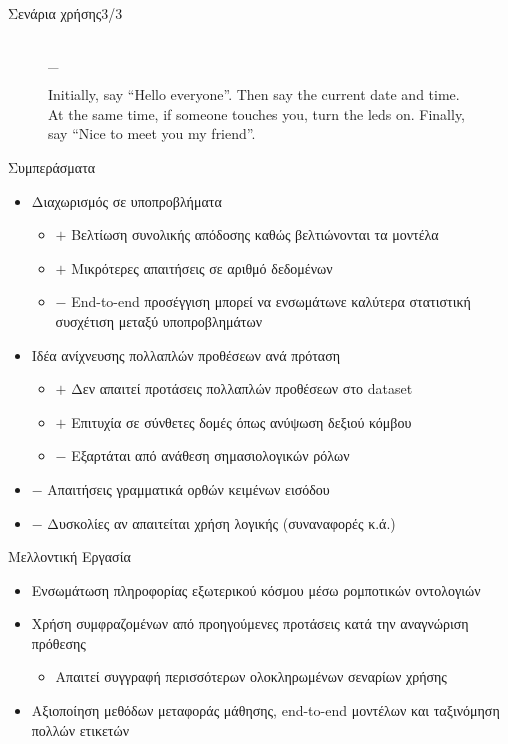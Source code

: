 \documentclass{beamer}
\makeatletter
\newcommand{\escapeunderscore}{\begingroup\@makeother\_\@escapeunderscore}
\newcommand*{\@escapeunderscore}[1]{#1\endgroup}
\makeatother
\begin{document}
{\begin{frame}{Σενάρια χρήσης\hfill{}3/3}
\begin{figure}
\begin{columns}[onlytextwidth]
            \caption{Initially, say ``Hello everyone''.
                Then say the current date and time.
                At the same time, if someone touches you, turn the leds on.
                Finally, say ``Nice to meet you my friend''.}
            \begin{adjustbox}{max width=\textwidth, max height=0.9\textheight}
                \escapeunderscore{}
            \end{adjustbox}
        \end{columns}
    \end{figure}
\end{frame}
}

\newcommand\pro{\item[$+$]}
\newcommand\con{\item[$-$]}
\begin{frame}{Συμπεράσματα}
    \begin{itemize}
        \item Διαχωρισμός σε υποπροβλήματα
              \begin{itemize}
                  \pro Βελτίωση συνολικής απόδοσης καθώς βελτιώνονται τα μοντέλα
                  \pro Μικρότερες απαιτήσεις σε αριθμό δεδομένων
                  \con End-to-end προσέγγιση μπορεί να ενσωμάτωνε καλύτερα στατιστική συσχέτιση μεταξύ υποπροβλημάτων
              \end{itemize}
        \item Ιδέα ανίχνευσης πολλαπλών προθέσεων ανά πρόταση
              \begin{itemize}
                  \pro Δεν απαιτεί προτάσεις πολλαπλών προθέσεων στο dataset
                  \pro Επιτυχία σε σύνθετες δομές όπως ανύψωση δεξιού κόμβου
                  \con Εξαρτάται από ανάθεση σημασιολογικών ρόλων
              \end{itemize}
              \con Απαιτήσεις γραμματικά ορθών κειμένων εισόδου
              \con Δυσκολίες αν απαιτείται χρήση λογικής (συναναφορές κ.ά.)
    \end{itemize}
\end{frame}

\begin{frame}{Μελλοντική Εργασία}
    \begin{itemize}
        \item Ενσωμάτωση πληροφορίας εξωτερικού κόσμου μέσω ρομποτικών οντολογιών
        \item Χρήση συμφραζομένων από προηγούμενες προτάσεις κατά την αναγνώριση πρόθεσης
              \begin{itemize}
                  \item Απαιτεί συγγραφή περισσότερων ολοκληρωμένων σεναρίων χρήσης
              \end{itemize}
        \item Αξιοποίηση μεθόδων μεταφοράς μάθησης, end-to-end μοντέλων και ταξινόμηση πολλών ετικετών
    \end{itemize}
\end{frame}
\end{document}
